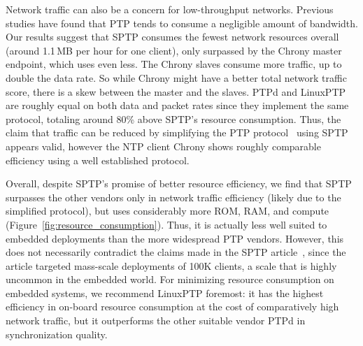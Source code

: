 Network traffic can also be a concern for low-throughput networks. Previous studies have found that PTP tends to consume a negligible amount of bandwidth. Our results suggest that SPTP consumes the fewest network resources overall (around 1.1\,MB per hour for one client), only surpassed by the Chrony master endpoint, which uses even less. The Chrony slaves consume more traffic, up to double the data rate. So while Chrony might have a better total network traffic score, there is a skew between the master and the slaves. PTPd and LinuxPTP are roughly equal on both data and packet rates since they implement the same protocol, totaling around 80\% above SPTP's resource consumption. Thus, the claim that traffic can be reduced by simplifying the PTP protocol~\cite{sptp} using SPTP appears valid, however the NTP client Chrony shows roughly comparable efficiency using a well established protocol.

Overall, despite SPTP's promise of better resource efficiency, we find that SPTP surpasses the other vendors only in network traffic efficiency (likely due to the simplified protocol), but uses considerably more ROM, RAM, and compute (Figure~\ref{fig:resource_consumption}). Thus, it is actually less well suited to embedded deployments than the more widespread PTP vendors. However, this does not necessarily contradict the claims made in the SPTP article~\cite{sptp}, since the article targeted mass-scale deployments of 100K clients, a scale that is highly uncommon in the embedded world. For minimizing resource consumption on embedded systems, we recommend LinuxPTP foremost: it has the highest efficiency in on-board resource consumption at the cost of comparatively high network traffic, but it outperforms the other suitable vendor PTPd in synchronization quality.
